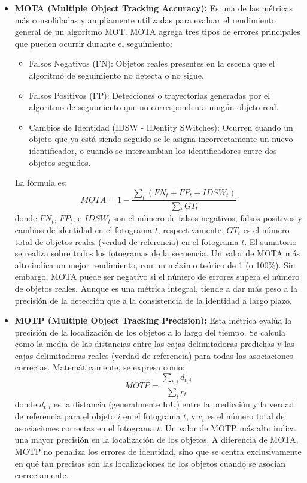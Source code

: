 \documentclass[11pt,spanish,listoffigures,listoftables]{tfgetsinf}
\begin{document}
\begin{itemize}
   \item \textbf{MOTA (Multiple Object Tracking Accuracy):} Es una de las métricas más consolidadas y ampliamente utilizadas para evaluar el rendimiento general de un algoritmo MOT. MOTA agrega tres tipos de errores principales que pueden ocurrir durante el seguimiento:
   \begin{itemize}
     \item Falsos Negativos (FN): Objetos reales presentes en la escena que el algoritmo de seguimiento no detecta o no sigue.
     \item Falsos Positivos (FP): Detecciones o trayectorias generadas por el algoritmo de seguimiento que no corresponden a ningún objeto real.
     \item Cambios de Identidad (IDSW - IDentity SWitches): Ocurren cuando un objeto que ya está siendo seguido se le asigna incorrectamente un nuevo identificador, o cuando se intercambian los identificadores entre dos objetos seguidos.
   \end{itemize}
   La fórmula es:
   \begin{equation}
   MOTA = 1 - \frac{\sum_{t} (FN_t + FP_t + IDSW_t)}{\sum_{t} GT_t}
   \end{equation}
   donde \(FN_t\), \(FP_t\), e \(IDSW_t\) son el número de falsos negativos, falsos positivos y cambios de identidad en el fotograma \(t\), respectivamente. \(GT_t\) es el número total de objetos reales (verdad de referencia) en el fotograma \(t\). El sumatorio se realiza sobre todos los fotogramas de la secuencia.
   Un valor de MOTA más alto indica un mejor rendimiento, con un máximo teórico de 1 (o 100\%). Sin embargo, MOTA puede ser negativo si el número de errores supera el número de objetos reales. Aunque es una métrica integral, tiende a dar más peso a la precisión de la detección que a la consistencia de la identidad a largo plazo.

   \item \textbf{MOTP (Multiple Object Tracking Precision):} Esta métrica evalúa la precisión de la localización de los objetos a lo largo del tiempo. Se calcula como la media de las distancias entre las cajas delimitadoras predichas y las cajas delimitadoras reales (verdad de referencia) para todas las asociaciones correctas. Matemáticamente, se expresa como:
   \begin{equation}
   MOTP = \frac{\sum_{t,i} d_{t,i}}{\sum_{t} c_t}
   \end{equation}
   donde $d_{t,i}$ es la distancia (generalmente IoU) entre la predicción y la verdad de referencia para el objeto $i$ en el fotograma $t$, y $c_t$ es el número total de asociaciones correctas en el fotograma $t$. Un valor de MOTP más alto indica una mayor precisión en la localización de los objetos. A diferencia de MOTA, MOTP no penaliza los errores de identidad, sino que se centra exclusivamente en qué tan precisas son las localizaciones de los objetos cuando se asocian correctamente.


\end{itemize}
\end{document}
